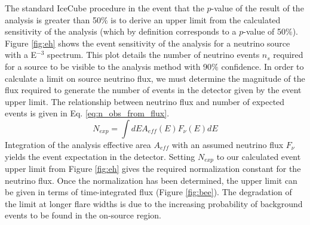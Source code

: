 \documentclass{gatech-thesis}
\begin{document}
The standard IceCube procedure in the event that the $p$-value of the result of the analysis is greater than 50$\%$ is to derive an upper limit from the calculated sensitivity of the analysis (which by definition corresponds to a $p$-value of 50$\%$). Figure \ref{fig:eh} shows the event sensitivity of the analysis for a neutrino source with a E$^{-3}$ spectrum. This plot details the number of neutrino events $n_s$ required for a source to be visible to the analysis method with 90$\%$ confidence. In order to calculate a limit on source neutrino flux, we must determine the magnitude of the flux required to generate the number of events in the detector given by the event upper limit. The relationship between neutrino flux and number of expected events is given in Eq. \ref{eq:n_obs_from_flux}.
\begin{equation}\label{eq:n_obs_from_flux}
N_{exp} = \int dEA_{eff}(E)F_{\nu}(E)dE
\end{equation}
Integration of the analysis effective area $A_{eff}$ with an assumed neutrino flux $F_{\nu}$ yields the event expectation in the detector. Setting $N_{exp}$ to our calculated event upper limit from Figure \ref{fig:eh} gives the required normalization constant for the neutrino flux. Once the normalization has been determined, the upper limit can be given in terms of time-integrated flux (Figure \ref{fig:bee}). The degradation of the limit at longer flare widths is due to the increasing probability of background events to be found in the on-source region.
\end{document}
